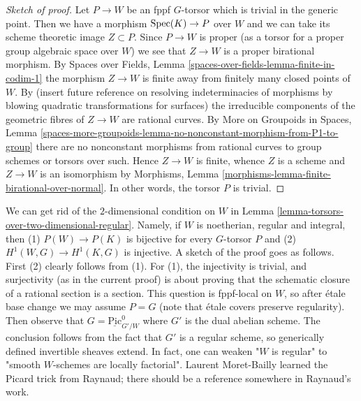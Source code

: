 \begin{proof}[Sketch of proof]
Let $P \to W$ be an fppf $G$-torsor which is trivial in the generic point.
Then we have a morphism $\mathop{\mathrm{Spec}}(K) \to P$ over $W$ and we can take
its scheme theoretic image $Z \subset P$. Since $P \to W$ is proper
(as a torsor for a proper group algebraic space over $W$)
we see that $Z \to W$ is a proper birational morphism.
By Spaces over Fields, Lemma \ref{spaces-over-fields-lemma-finite-in-codim-1}
the morphism $Z \to W$ is finite away from finitely many closed points
of $W$. By (insert future reference on resolving indeterminacies
of morphisms by blowing quadratic transformations for surfaces)
the irreducible components of the geometric fibres of $Z \to W$
are rational curves. By
More on Groupoids in Spaces, Lemma
\ref{spaces-more-groupoids-lemma-no-nonconstant-morphism-from-P1-to-group}
there are no nonconstant morphisms from rational curves
to group schemes or torsors over such.
Hence $Z \to W$ is finite, whence $Z$ is a scheme and $Z \to W$
is an isomorphism by
Morphisms, Lemma \ref{morphisms-lemma-finite-birational-over-normal}.
In other words, the torsor $P$ is trivial.
\end{proof}

\begin{remark}
\label{remark-torsors-over-regular}
We can get rid of the $2$-dimensional condition on $W$ in
Lemma \ref{lemma-torsors-over-two-dimensional-regular}.
Namely, if $W$ is noetherian, regular and integral, then
(1) $P(W)\to P(K)$ is bijective for every $G$-torsor $P$ and
(2) $H^1(W,G)\to H^1(K,G)$ is injective.
A sketch of the proof goes as follows.
First (2) clearly follows from (1). For (1), the
injectivity is trivial, and surjectivity (as in the current proof)
is about proving that the schematic closure of a rational section
is a section. This question is fppf-local on $W$, so after \'etale base
change we may assume $P=G$ (note that \'etale covers preserve regularity).
Then observe that $G=\underline{\mathrm{Pic}}^0_{G'/W}$ where $G'$
is the dual abelian scheme. The conclusion follows from the fact
that $G'$ is a regular scheme, so generically defined invertible
sheaves extend. In fact, one can weaken "$W$ is regular" to
"smooth $W$-schemes are locally factorial". Laurent Moret-Bailly
learned the Picard trick from Raynaud; there should be a reference
somewhere in Raynaud's work.
\end{remark}

